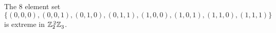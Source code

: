 \subsection{\Times{}}

\begin{prop}\label{prop8inZ2.X.Z2.X.Z3}
The 8 element set 
\[
\{(0, 0, 0),  (0, 0, 1),  (0, 1, 0),  (0, 1, 1),  (1, 0, 0),  (1, 0, 1),  (1, 1, 0),  (1, 1, 1) \}
\] 
is extreme in $\texttt{$\mathbb Z_{2}^{\,2}$}\texttt{$\mathbb Z_{3}^{\,}$}$. \newline \end{prop} 


